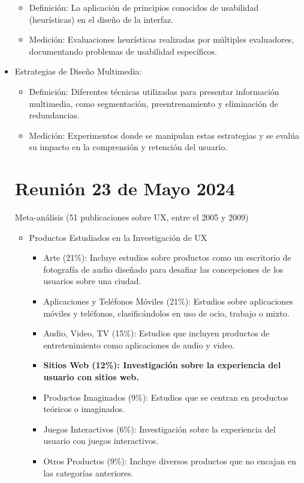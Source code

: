 \begin{itemize}
    \begin{itemize}
        \item Definición: La aplicación de principios conocidos de usabilidad (heurísticas) en el diseño de la interfaz.
        \item Medición: Evaluaciones heurísticas realizadas por múltiples evaluadores, documentando problemas de usabilidad específicos.
    \end{itemize}
    \item Estrategias de Diseño Multimedia: \cite{mayer2003nine}
    \begin{itemize}
        \item Definición: Diferentes técnicas utilizadas para presentar información multimedia, como segmentación, preentrenamiento y eliminación de redundancias.
        \item Medición: Experimentos donde se manipulan estas estrategias y se evalúa su impacto en la comprensión y retención del usuario.
    \end{itemize}


\section{Reunión 23 de Mayo 2024}

Meta-análisis (51 publicaciones sobre UX, entre el 2005 y 2009) \cite{bargas2011old}

\begin{itemize}
    \item Productos Estudiados en la Investigación de UX
    \begin{itemize}
        \item  Arte (21\%): Incluye estudios sobre productos como un escritorio de fotografía de audio diseñado para desafiar las concepciones de los usuarios sobre una ciudad.
        \item Aplicaciones y Teléfonos Móviles (21\%): Estudios sobre aplicaciones móviles y teléfonos, clasificándolos en uso de ocio, trabajo o mixto.
        \item Audio, Video, TV (15\%): Estudios que incluyen productos de entretenimiento como aplicaciones de audio y video.
        \item \textbf{Sitios Web (12\%): Investigación sobre la experiencia del usuario con sitios web.}
        \item  Productos Imaginados (9\%): Estudios que se centran en productos teóricos o imaginados.
        \item Juegos Interactivos (6\%): Investigación sobre la experiencia del usuario con juegos interactivos.
        \item Otros Productos (9\%): Incluye diversos productos que no encajan en las categorías anteriores.
    \end{itemize}


\end{itemize}
\end{itemize}
